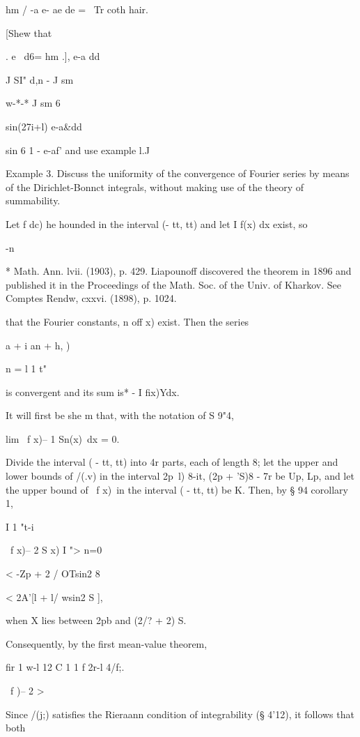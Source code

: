 hm / -a e- ae de = \ Tr coth hair.

 [Shew that

  . e~ d6= hm .], e-a dd

J SI" d,n - J sm

w-*-* J sm 6

  sin(27i+l) e-a\&dd

sin 6 1 - e-af' and use example l.J

Example 3. Discuss the uniformity of the convergence of Fourier series
by means of the Dirichlet-Bonnct integrals, without making use of the
theory of summability.

Let f dc) he hounded in the interval (- tt, tt) and let I f(x) dx
exist, so

 -n

* Math. Ann. lvii. (1903), p. 429. Liapounoff discovered the theorem
in 1896 and published it in the Proceedings of the Math. Soc. of the
Univ. of Kharkov. See Comptes Rendw, cxxvi. (1898), p. 1024.

%
%

that the Fourier constants, n off x) exist. Then the series

 a + i an + h, )

n = l 1 t"

is convergent and its sum is* - I fix)Ydx.

It will first be she m that, with the notation of S 9"4,

lim \ f x)-- 1 Sn(x)\ dx = 0.

Divide the interval ( - tt, tt) into 4r parts, each of length 8; let
the upper and lower bounds of /(.v) in the interval 2p~l) 8-it, (2p +
'S)8 - 7r be Up, Lp, and let the upper bound of \ f x)\ in the
interval ( - tt, tt) be K. Then, by § 94 corollary 1,

I 1 "t-i

\ f x)-- 2 S x) I "> n=0

< -Zp + 2 / OTsin2 8

< 2A'[l + l/ wsin2 S ],

when X lies between 2pb and (2/? + 2) S.

Consequently, by the first mean-value theorem,

fir 1 w-l 12 C 1 1 f 2r-l 4/f;. \

\ f )-- 2 >%

Since /(j;) satisfies the Rieraann condition of integrability (§
4'12), it follows that both

